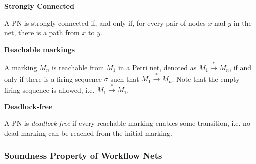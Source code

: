 \documentclass[12pt]{article}
\begin{document}
        \begin{definition} \textbf{Strongly Connected} \cite{malinao-rdlt}

        A PN is strongly connected if, and only if, for every pair of nodes $x$ nad $y$ in the net, there is a path from $x$ to $y$.
            
        \end{definition}

        \begin{definition} \textbf{Reachable markings} \cite{malinao-rdlt}
        
        A marking $M_{n}$ is reachable from $M_{1}$ in a Petri net, denoted as $M_{1} \overset{*}{\rightarrow} M_{n}$, if and only if there is a firing sequence $\sigma$ such that $M_{1} \overset{*}{\rightarrow} M_{n}$. Note that the empty firing sequence is allowed, i.e. $M_{1} \overset{*}{\rightarrow} M_{1}$.
            
        \end{definition}

        \begin{definition} \textbf{Deadlock-free} \cite{malinao-rdlt}

        A PN is \textit{deadlock-free} if every reachable marking enables some transition, i.e. no dead marking can be reached from the initial marking.
            
        \end{definition}

        \subsubsection*{Soundness Property of Workflow Nets}
\end{document}

